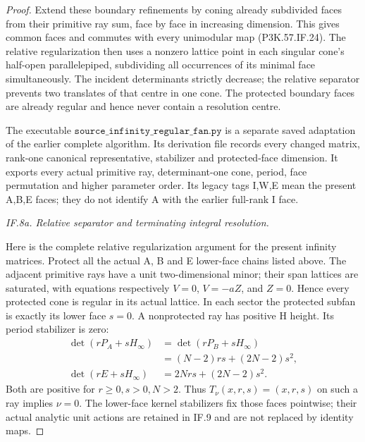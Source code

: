 \begin{proof}
Extend these boundary refinements by coning already subdivided
faces from their primitive ray sum, face by face in increasing
dimension. This gives common faces and commutes with every
unimodular map (P3K.57.IF.24). The relative regularization then uses a
nonzero lattice point in each singular cone's half-open
parallelepiped, subdividing all occurrences of its minimal face
simultaneously. The incident determinants strictly decrease;
the relative separator prevents two translates of that centre
in one cone. The protected boundary faces are already regular
and hence never contain a resolution centre.

The executable \(\texttt{source\_infinity\_regular\_fan.py}\) is a
separate saved adaptation of the earlier complete algorithm.
Its derivation file records every changed matrix, rank-one
canonical representative, stabilizer and protected-face dimension.
It exports every actual primitive ray, determinant-one cone,
period, face permutation and higher parameter order. Its legacy
tags I,W,E mean the present A,B,E faces; they do not identify A
with the earlier full-rank I face.

\par\smallskip\noindent\textit{IF.8a. Relative separator and terminating integral resolution.}\par\nopagebreak[4]

Here is the complete relative regularization argument for the
present infinity matrices. Protect all the actual A, B and E
lower-face chains listed above. The adjacent primitive rays
have a unit two-dimensional minor; their span lattices are
saturated, with equations respectively \(V=0\),
\(V=-aZ\), and \(Z=0\). Hence every protected cone is
regular in its actual lattice. In each sector the protected
subfan is exactly its lower face \(s=0\). A nonprotected
ray has positive H height. Its period stabilizer is zero:
\[
 \begin{aligned}
 \det(rP_A+sH_\infty)&=\det(rP_B+sH_\infty)\\
                    &=(N-2)rs+(2N-2)s^2,\\
 \det(rE+sH_\infty)&=2Nrs+(2N-2)s^2.
 \end{aligned}                                         \tag{P3K.57.IF.26a}
\]
Both are positive for \(r\ge0,s>0,N>2\). Thus
\(T_\nu(x,r,s)=(x,r,s)\) on such a ray implies
\(\nu=0\). The lower-face kernel stabilizers fix those
faces pointwise; their actual analytic unit actions are
retained in IF.9 and are not replaced by identity maps.


\end{proof}
